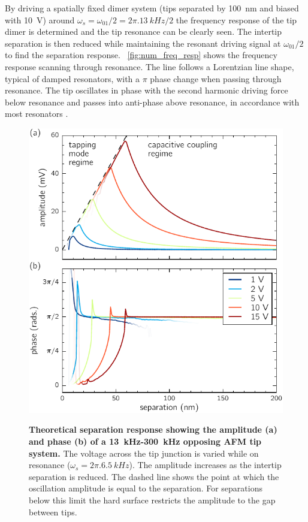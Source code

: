 \documentclass{article}
\begin{document}
By driving a spatially fixed dimer system (tips separated by \SI{100}{nm} and biased with \SI{10}{V}) around $\omega_s = \omega_{01}/2 = 2\pi.\SI{13}{kHz}/2$ the frequency response of the tip dimer is determined and the tip resonance can be clearly seen. The intertip separation is then reduced while maintaining the resonant driving signal at $\omega_{01}/2$ to find the separation response.
\figurename~\ref{fig:num_freq_resp} shows the frequency response scanning through resonance. The line follows a Lorentzian line shape, typical of damped resonators, with a $\pi$ phase change when passing through resonance. The tip oscillates in phase with the second harmonic driving force below resonance and passes into anti-phase above resonance, in accordance with most resonators \cite{}.

\begin{figure}[h]
\centering
{\includegraphics{figures/afm_theory_separation_response}}
{\caption[Theoretical separation response showing the amplitude (a) and phase (b) of a \SI{13}{kHz}-\SI{300}{kHz} opposing AFM tip system]{\textbf{Theoretical separation response showing the amplitude (a) and phase (b) of a \SI{13}{kHz}-\SI{300}{kHz} opposing AFM tip system.} The voltage across the tip junction is varied while on resonance ($\omega_s = 2\pi.\SI{6.5}{kHz}$). The amplitude increases as the intertip separation is reduced. The dashed line shows the point at which the oscillation amplitude is equal to the separation. For separations below this limit the hard surface restricts the amplitude to the gap between tips.}
\label{fig:num_sep_resp}}
\end{figure}
\end{document}
